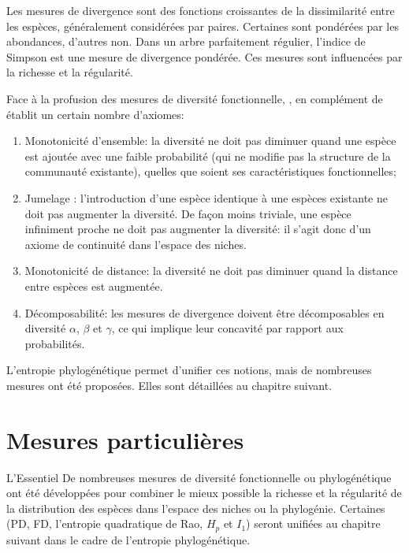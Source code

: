 \documentclass[
  11pt,
  french,
  a4paper,
  extrafontsizes,onecolumn,openright
  ]{memoir}
\providecommand{\tightlist}{%
  \setlength{\itemsep}{0pt}\setlength{\parskip}{0pt}}
\newenvironment{Summary}
  {\begin{bclogo}[logo=\bctrombone, noborder=true, couleur=lightgray!50]{L'Essentiel}\parindent0pt}
  {\end{bclogo}}
\newlength{\rf}
\begin{document}
Les mesures de divergence sont des fonctions croissantes de la dissimilarité entre les espèces, généralement considérées par paires.
Certaines sont pondérées par les abondances, d'autres non.
Dans un arbre parfaitement régulier, l'indice de Simpson est une mesure de divergence pondérée.
Ces mesures sont influencées par la richesse et la régularité.

Face à la profusion des mesures de diversité fonctionnelle, \textcite{Ricotta2005d}, en complément de \textcite{Solow1994} établit un certain nombre d'axiomes:

\begin{enumerate}
\def\labelenumi{\arabic{enumi}.}
\tightlist
\item
  Monotonicité d'ensemble: la diversité ne doit pas diminuer quand une espèce est ajoutée avec une faible probabilité (qui ne modifie pas la structure de la communauté existante), quelles que soient ses caractéristiques fonctionnelles;
\item
  Jumelage \autocite{Weitzman1992}: l'introduction d'une espèce identique à une espèces existante ne doit pas augmenter la diversité. De façon moins triviale, une espèce infiniment proche ne doit pas augmenter la diversité: il s'agit donc d'un axiome de continuité dans l'espace des niches.
\item
  Monotonicité de distance: la diversité ne doit pas diminuer quand la distance entre espèces est augmentée.
\item
  Décomposabilité: les mesures de divergence doivent être décomposables en diversité \(\alpha\), \(\beta\) et \(\gamma\), ce qui implique leur concavité par rapport aux probabilités.
\end{enumerate}

L'entropie phylogénétique permet d'unifier ces notions, mais de nombreuses mesures ont été proposées.
Elles sont détaillées au chapitre suivant.

\hypertarget{mesures-particuliuxe8res}{%
\chapter{Mesures particulières}\label{mesures-particuliuxe8res}}

\scriptsize

\begin{Summary}
De nombreuses mesures de diversité fonctionnelle ou phylogénétique ont
été développées pour combiner le mieux possible la richesse et la
régularité de la distribution des espèces dans l'espace des niches ou la
phylogénie. Certaines (PD, FD, l'entropie quadratique de Rao, \(H_p\) et
\(I_1\)) seront unifiées au chapitre suivant dans le cadre de l'entropie
phylogénétique.
\end{Summary}
\end{document}
